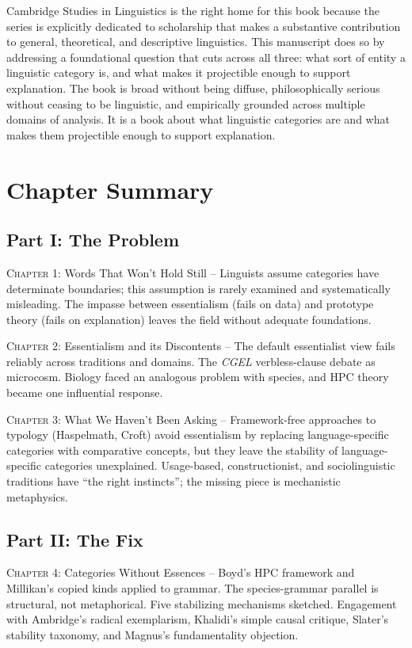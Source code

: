 \documentclass[11pt]{book}
\newcommand{\labelsc}[1]{{\mdseries\textsc{#1}}}
\begin{document}
Cambridge Studies in Linguistics is the right home for this book because the series is explicitly dedicated to scholarship that makes a substantive contribution to general, theoretical, and descriptive linguistics. This manuscript does so by addressing a foundational question that cuts across all three: what sort of entity a linguistic category is, and what makes it projectible enough to support explanation. The book is broad without being diffuse, philosophically serious without ceasing to be linguistic, and empirically grounded across multiple domains of analysis. It is a book about what linguistic categories are and what makes them projectible enough to support explanation.

\section{Chapter Summary}

\subsection*{Part I: The Problem}

\labelsc{Chapter 1:} Words That Won't Hold Still -- Linguists assume categories have determinate boundaries; this assumption is rarely examined and systematically misleading. The impasse between essentialism (fails on data) and prototype theory (fails on explanation) leaves the field without adequate foundations.

\labelsc{Chapter 2:} Essentialism and its Discontents -- The default essentialist view fails reliably across traditions and domains. The \emph{CGEL} verbless-clause debate as microcosm. Biology faced an analogous problem with species, and HPC theory became one influential response.

\labelsc{Chapter 3:} What We Haven't Been Asking -- Framework-free approaches to typology (Haspelmath, Croft) avoid essentialism by replacing language-specific categories with comparative concepts, but they leave the stability of language-specific categories unexplained. Usage-based, constructionist, and sociolinguistic traditions have \enquote{the right instincts}; the missing piece is mechanistic metaphysics.

\subsection*{Part II: The Fix}

\labelsc{Chapter 4:} Categories Without Essences -- Boyd's HPC framework and Millikan's copied kinds applied to grammar. The species-grammar parallel is structural, not metaphorical. Five stabilizing mechanisms sketched. Engagement with Ambridge's radical exemplarism, Khalidi's simple causal critique, Slater's stability taxonomy, and Magnus's fundamentality objection.
\end{document}
